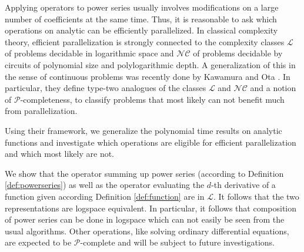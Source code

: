 \documentclass{article}
\newcommand{\p}{\ensuremath{\mathcal P}\xspace}
\newcommand{\cl}{\ensuremath{\mathcal{L}}\xspace}
\newcommand{\nc}{\ensuremath{\mathcal{NC}}\xspace}
\begin{document}
Applying operators to power series usually involves modifications on a large number of coefficients at the same time.
Thus, it is reasonable to ask which operations on analytic can be efficiently parallelized.
In classical complexity theory, efficient parallelization is strongly connected to the complexity classes \cl of problems decidable in logarithmic space and \nc of problems decidable by circuits of polynomial size and polylogarithmic depth.
A generalization of this in the sense of continuous problems was recently done by Kawamura and Ota \cite{Kawamura2014}.
In particular, they define type-two analogues of the classes \cl and \nc and a notion of \p-completeness, to classify problems that most likely can not benefit much from parallelization.

Using their framework, we generalize the polynomial time results on analytic functions and investigate which operations are eligible for efficient parallelization and which most likely are not.

We show that the operator summing up power series (according to Definition \ref{def:powerseries}) as well as the operator evaluating the $d$-th derivative of a function given according Definition \ref{def:function} are in \cl.
It follows that the two representations are logspace equivalent.
In particular, it follows that composition of power series can be done in logspace which can not easily be seen from the usual algorithms.
Other operations, like solving ordinary differential equations, are expected to be \p-complete and will be subject to future investigations.


{}
\end{document}
